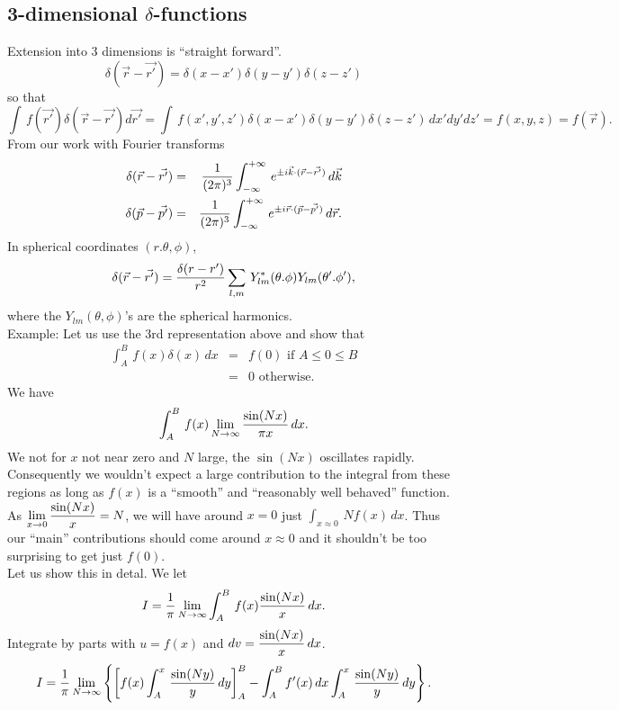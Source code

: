 \subsection{3-dimensional $\delta$-functions}
Extension into 3 dimensions is ``straight forward''. 
$$\delta(\vec{r} - \vec{r'}) = \delta(x-x')\delta(y-y')\delta(z-z')$$ so that 
$$\int\, f(\vec{r'}) \delta(\vec{r} - \vec{r'}) d\vec{r'} = \int\, f(x',y',z') \delta(x-x')\delta(y-y')\delta(z-z')\, dx'dy'dz' = f(x,y,z) = f(\vec{r}).$$
From our work with Fourier transforms
\begin{eqnarray*}
\delta(\vec{r}-\vec{r'}) &=& {1\over (2\pi)^3}   \int_{-\infty}^{+\infty}\, e^{\pm i \vec{k}\cdot(\vec{r}-\vec{r'}) }\, d\vec{k}\\
\delta(\vec{p}-\vec{p'}) &=& {1\over (2\pi)^3} \int_{-\infty}^{+\infty}\, e^{\pm i \vec{r}\cdot(\vec{p}-\vec{p'}) }\, d\vec{r}.
\end{eqnarray*}
In spherical coordinates $(r.\theta, \phi)$,
$$\delta(\vec{r}-\vec{r'}) = {\delta(r - r')\over r^2} \sum_{l,m}\, Y_{lm}^*(\theta.\phi)Y_{lm}(\theta'.\phi'),$$ where the $Y_{lm}(\theta,\phi)$'s are the spherical harmonics.\\
Example: Let us use the 3rd representation above and show that 
\begin{eqnarray*}
\int_A^B\, f(x)\delta(x)\, dx &=& f(0) \mbox{ if } A \le 0 \le B\\
                                          &=& 0 \mbox{ otherwise.}
\end{eqnarray*} We have 
$$\int_A^B\, f(x) \lim_{N\rightarrow \infty} {\sin(Nx)\over \pi x}\, dx.$$ We not for $x$ not near zero and $N$ large, the $\sin(Nx)$ oscillates rapidly. Consequently we wouldn't expect a large contribution to the integral
from these regions as long as $f(x)$ is a ``smooth'' and ``reasonably well behaved'' function.\\
As $\displaystyle \lim_{x\rightarrow0} {\sin(Nx)\over x} = N$, we will have around $x=0$ just $\displaystyle \int_{x\approx0} \, N f(x)\, dx$. Thus our ``main'' contributions should come around
$x\approx0$ and it shouldn't be too surprising to get just $f(0)$.\\
Let us show this in detal. We let 
$$I = {1\over\pi}\lim_{N\rightarrow\infty} \int_A^B\, f(x) {\sin(Nx)\over x}\,dx.$$
Integrate by parts with $u=f(x)$ and $\displaystyle dv = {\sin(Nx)\over x}\,dx$.
$$I = {1\over\pi} \lim_{N\rightarrow\infty} \left\{\left[ f(x) \int_A^x\, {\sin(Ny)\over y} \, dy \right]_A^B  - \int_A^B f'(x)\,dx \int_A^x\, {\sin(Ny)\over y} \,dy \right\}.$$
